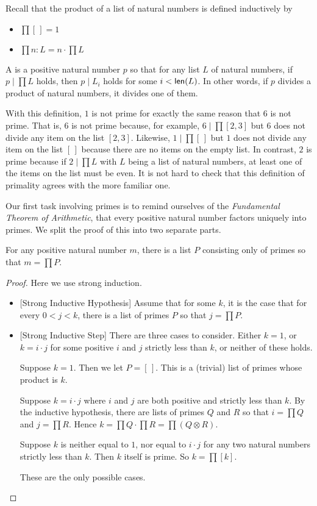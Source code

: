 Recall that the product of a list of natural numbers is defined inductively by
\begin{itemize}
\item $\prod [\,] = 1$
\item $\prod n:L = n \cdot \prod L$
\end{itemize}

\begin{defn}
  A  is a positive natural number $p$ so that for any list $L$ of natural numbers, if $p \mid \prod L$ holds, then $p \mid L_i$
holds for some $i<{\mathord{\textsf{len}}}(L)$. In other words, if $p$ divides a product of natural numbers, it divides one of them.
\end{defn}

With this definition, $1$ is not prime for exactly the same reason that $6$
is not prime.
That is, $6$ is not prime because, for example, $6 \mid  \prod[2,3]$ but $6$ does not divide any item on the list $[2,3]$.
Likewise, $1 \mid  \prod [\,]$ but $1$ does not divide any item on the list $[\,]$ because there are no items on the empty list.
In contrast, $2$ is prime because if $2\mid\prod L$ with $L$ being a list of natural numbers, at least one of the items on the list must be even.
It is not hard to check that this definition of primality agrees with the more familiar one.

Our first task involving primes is to remind ourselves of the \emph{Fundamental Theorem of Arithmetic}, that every positive natural number factors uniquely into primes. 
We split the proof of this into two separate parts.

\begin{lem}\label{lem:prime-factorization}
  For any positive natural number $m$, there is a list $P$
consisting only of primes so that $m = \prod P$.

\begin{proof}
  Here we use strong induction. 
  \begin{itemize}
  \item{}[Strong Inductive Hypothesis] Assume that for some $k$, it is the case that for every $0<j<k$,
   there is a list of primes $P$ so that $j=\prod P$.
  \item{}[Strong Inductive Step] There are three cases to consider. Either $k=1$,
or $k = i\cdot j$ for some positive $i$ and $j$ strictly less than $k$, or neither of these holds.

Suppose $k = 1$. Then we let $P=[\,]$. This is
a (trivial) list of primes whose product is $k$.

  Suppose $k = i\cdot j$ where $i$ and $j$
  are both positive and strictly less than $k$. By the inductive hypothesis, 
  there are lists of primes $Q$ and $R$ so that $i=\prod Q$ and $j=\prod R$.
  Hence $k = \prod Q\cdot \prod R = \prod (Q\otimes R)$.

  Suppose $k$ is neither equal to $1$, nor equal to $i\cdot j$ for
any two natural numbers strictly less than $k$. Then $k$ itself is 
  prime. So $k = \prod [k]$. 

These are the only possible cases.
  \end{itemize}
\end{proof}
\end{lem}

